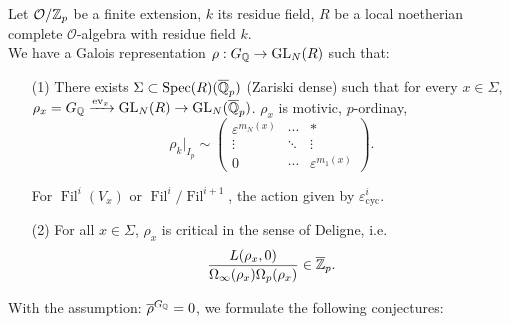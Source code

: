 \documentclass[12pt,amsfont]{amsart}
\begin{document}
Let $\mathcal{O}/{\mathbb Z}_p$ be a finite extension, $k$ its residue field, $R$ be a local noetherian complete $\mathcal{O}$-algebra with residue field $k$. \\
We have a Galois representation $\rho: G_{\mathbb Q} \rightarrow \operatorname{GL}_N(R)$ such that:
\begin{enumerate}
\item[(1)] There exists $\Sigma \subset \operatorname{Spec}(R)(\overline{{\mathbb Q}}_p)$ (Zariski dense) such that for every $x \in \Sigma$, $\rho_x = G_{\mathbb Q} \xrightarrow{\operatorname{ev}_x} \operatorname{GL}_N(R) \rightarrow \operatorname{GL}_N(\overline{{\mathbb Q}}_p)$. $\rho_x$ is motivic, $p$-ordinay,
$$\displaystyle \rho_k |_{I_p} \sim \begin{pmatrix} \varepsilon^{m_N(x)} & \cdots & \ast \\ \vdots & \ddots & \vdots \\ 0 & \cdots & \varepsilon^{m_1(x)} \end{pmatrix}.$$

For $\operatorname{Fil}^i(V_x)$ or $\operatorname{Fil}^i/\operatorname{Fil}^{i+1}$, the action given by $\varepsilon_{\text{cyc}}^i$. 
\item[(2)]
For all $x \in \Sigma$, $\rho_x$ is critical in the sense of Deligne, i.e.
\[
\frac{L(\rho_x, 0)}{\Omega_\infty(\rho_x) \Omega_p(\rho_x)} \in \overline{{\mathbb Z}}_p.
\]
\end{enumerate}
With the assumption: $\overline{\rho}^{G_{\mathbb Q}} = 0$, we formulate the following conjectures:
\end{document}
